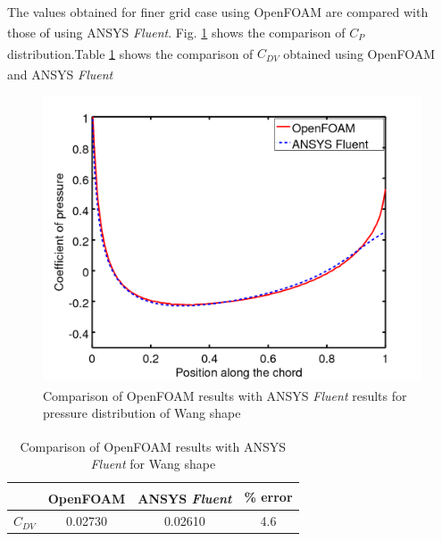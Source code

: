 The values obtained for finer grid case using OpenFOAM\textsuperscript{\textregistered} are compared with those of using ANSYS\textsuperscript{\textregistered} \textit{Fluent}. Fig. \ref{wang comp} shows the comparison of $ C_{P} $ distribution.Table \ref{wang table} shows the comparison of $ C_{DV} $ obtained using OpenFOAM\textsuperscript{\textregistered} and ANSYS\textsuperscript{\textregistered} \textit{Fluent}
\begin{figure}[H]
	\centering
	\includegraphics[width=300 pt]{rnd/wang_cp.png}
	\caption{Comparison of OpenFOAM\textsuperscript{\textregistered} results with ANSYS\textsuperscript{\textregistered} \textit{Fluent} results for pressure distribution of Wang shape}
	\label{wang comp} %
\end{figure}
\begin{table}[H]
	\centering
	\caption{\label{wang table} Comparison of OpenFOAM\textsuperscript{\textregistered} results with ANSYS\textsuperscript{\textregistered} \textit{Fluent} for Wang shape}
	\begin{tabular}{cccc}
		\hline \hline
		& OpenFOAM\textsuperscript{\textregistered} & ANSYS\textsuperscript{\textregistered} \textit{Fluent} & \% error \\ \hline \hline
		
		$ C_{DV} $ & 0.02730 & 0.02610 & 4.6    \\ \hline
	\end{tabular}
\end{table}


